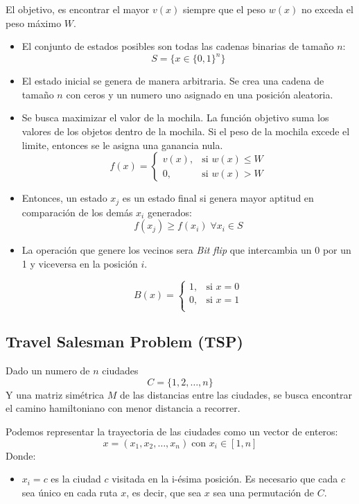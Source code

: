 \documentclass[12pt,twoside]{article}
\begin{document}
	El objetivo, es encontrar el mayor $v(x)$ siempre que el peso $w(x)$ no exceda el peso máximo $W$. 
	
	\begin{itemize}
		\item El conjunto de estados posibles son todas las cadenas binarias de tamaño $n$: \[ S = \{ x \in \{ 0, 1  \}^n \} \]
		
		\item El estado inicial se genera de manera arbitraria. Se crea una cadena de tamaño $n$ con ceros y un numero uno asignado en una posición aleatoria.
		
		\item Se busca maximizar el valor de la mochila. La función objetivo suma los valores de los objetos dentro de la mochila. Si el peso de la mochila excede el limite, entonces se le asigna una ganancia nula.
		\[
		f(x) =
		\begin{cases} 
			v(x), & \text{si } w(x) \leq W \\ 
			0, & \text{si } w(x) > W
		\end{cases}
		\]
		
		\item Entonces, un estado $x_j$ es un estado final si genera mayor aptitud en comparación de los demás $x_i$ generados: \[f(x_j) \geq f(x_i) \; \forall x_i \in S\]
		
		\item La operación que genere los vecinos sera \textit{Bit flip} que intercambia un 0 por un 1 y viceversa en la posición $i$.
		
		\[
		B(x) =
		\begin{cases} 
			1, & \text{si } x = 0 \\ 
			0, & \text{si } x = 1 \\
		\end{cases}
		\]
		
		
	\end{itemize}
	
	\subsection{Travel Salesman Problem (TSP)}
	
	Dado un numero de $n$ ciudades \[ C = \{1,2, \dots , n\} \] Y una matriz simétrica $M$ de las distancias entre las ciudades, se busca encontrar el camino hamiltoniano con menor distancia a recorrer. 
	
	Podemos representar la trayectoria de las ciudades como un vector de enteros:
	\[ x = (x_1, x_2, \dots, x_n) \; \text{con } x_i \in [1, n] \]
	Donde:
	\begin{itemize}
		\item $x_i = c$ es la ciudad $c$ visitada en la i-ésima posición. Es necesario que cada $c$ sea único en cada ruta $x$, es decir, que sea $x$ sea una permutación de $C$.
	\end{itemize}
	
\end{document}
